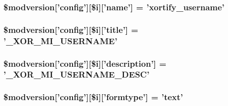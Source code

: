 \hypertarget{xoops__version_8php_a97bde72eb399d36cae8b92f0fe643e4c}{
\subsubsection[{\$modversion}]{\setlength{\rightskip}{0pt plus 5cm}\$modversion\mbox{[}'config'\mbox{]}\mbox{[}\$i\mbox{]}\mbox{[}'name'\mbox{]} = 'xortify\-\_\-username'}}\label{xoops__version_8php_a97bde72eb399d36cae8b92f0fe643e4c}
\hypertarget{xoops__version_8php_a2f084d4cbd766a0a77a22c3a0569d00a}{
\subsubsection[{\$modversion}]{\setlength{\rightskip}{0pt plus 5cm}\$modversion\mbox{[}'config'\mbox{]}\mbox{[}\$i\mbox{]}\mbox{[}'title'\mbox{]} = '{\bf \-\_\-\-X\-O\-R\-\_\-\-M\-I\-\_\-\-U\-S\-E\-R\-N\-A\-M\-E}'}}\label{xoops__version_8php_a2f084d4cbd766a0a77a22c3a0569d00a}
\hypertarget{xoops__version_8php_a5e9eb73a3e95f753e596d6a407eaa7e2}{
\subsubsection[{\$modversion}]{\setlength{\rightskip}{0pt plus 5cm}\$modversion\mbox{[}'config'\mbox{]}\mbox{[}\$i\mbox{]}\mbox{[}'description'\mbox{]} = '{\bf \-\_\-\-X\-O\-R\-\_\-\-M\-I\-\_\-\-U\-S\-E\-R\-N\-A\-M\-E\-\_\-\-D\-E\-S\-C}'}}\label{xoops__version_8php_a5e9eb73a3e95f753e596d6a407eaa7e2}
\hypertarget{xoops__version_8php_a3a99fbd85eb007c5a24976ed7a746dc5}{
\subsubsection[{\$modversion}]{\setlength{\rightskip}{0pt plus 5cm}\$modversion\mbox{[}'config'\mbox{]}\mbox{[}\$i\mbox{]}\mbox{[}'formtype'\mbox{]} = 'text'}}\label{xoops__version_8php_a3a99fbd85eb007c5a24976ed7a746dc5}
